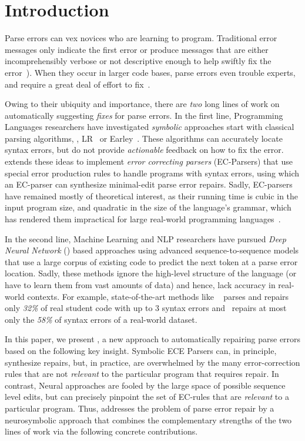 
\section{Introduction}
\label{sec:intro}

Parse errors can vex novices who
are learning to program.
%
Traditional error messages
only indicate the first error
or produce messages that
are either incomprehensibly
verbose or not descriptive
enough to help swiftly fix
the error~\citep{qian2017, VanDerSpek_2005}).
%
When they occur in larger code bases, parse errors
even trouble experts, and require a great deal of
effort to fix~\citep{Denny_2012, Ahadi_2018, Kummerfeld2003}.

Owing to their ubiquity and importance, there are \emph{two}
long lines of work on automatically suggesting \emph{fixes}
for parse errors.
%
In the first line, Programming Languages researchers
have investigated \emph{symbolic} approaches start
with classical parsing algorithms, \eg, LR~\citep{Aho1974}
or Earley~\citep{Earley_1970}.
%
These algorithms can accurately locate syntax errors,
but do not provide \emph{actionable} feedback on how
to fix the error.
%
\citet{Aho_1972} extends these ideas to implement
\emph{error correcting parsers} (EC-Parsers) that
use special error production rules to handle
programs with syntax errors, using which an EC-parser
can synthesize minimal-edit parse error repairs.
%
Sadly, EC-parsers have remained mostly of theoretical
interest, as their running time is cubic in the input
program size, and quadratic in the size of the language's
grammar, which has rendered them impractical for large
real-world programming languages~\citep{McLean1996, Rajasekaran2014}.

In the second line, Machine Learning and NLP researchers have
pursued \emph{Deep Neural Network} (\dnn)
based approaches using advanced sequence-to-sequence
models \citep{Sutskever_2014, Hardalov_2018}
that use a large corpus of existing code to predict
the next token \eg at a parse error location.
%
Sadly, these methods ignore the high-level structure
of the language (or have to learn them from vast amounts
of data) and hence, lack accuracy in real-world contexts.
%
For example, state-of-the-art methods like ~\citep{Ahmed_2021}
parses and repairs only \emph{32\%} of real student code with
up to 3 syntax errors and~\citep{Wu2020} repairs at most only
the \emph{58\%} of syntax errors of a real-world dataset.

In this paper, we present \toolname, a new approach
to automatically repairing parse errors
based on the following key insight.
%
Symbolic ECE Parsers \citep{Aho_1972} can, in principle,
synthesize repairs, but, in practice, are overwhelmed by
the many error-correction rules that are not \emph{relevant}
to the particular program that requires repair.
%
In contrast, Neural approaches are fooled by the large
space of possible sequence level edits, but can precisely
pinpoint the set of EC-rules that are \emph{relevant}
to a particular program.
%
Thus, \toolname addresses the problem of parse error
repair by a neurosymbolic approach that combines 
the complementary strengths of the two lines of work 
via the following concrete contributions.

